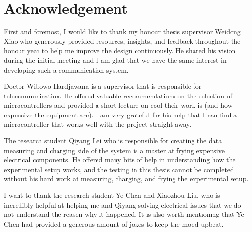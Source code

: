 \documentclass[../thesis.tex]{subfiles}
\begin{document}
\chapter*{Acknowledgement}

First and foremost, I would like to thank my honour thesis supervisor Weidong Xiao who generously provided resources, insights, and feedback throughout the honour year to help me improve the design continuously. He shared his vision during the initial meeting and I am glad that we have the same interest in developing such a communication system.

Doctor Wibowo Hardjawana is a supervisor that is responsible for telecommunication. He offered valuable recommendations on the selection of microcontrollers and provided a short lecture on cool their work is (and how expensive the equipment are). I am very grateful for his help that I can find a microcontroller that works well with the project straight away.

The research student Qiyang Lei who is responsible for creating the data measuring and charging side of the system is a master at frying expensive electrical components. He offered many bits of help in understanding how the experimental setup works, and the testing in this thesis cannot be completed without his hard work at measuring, charging, and frying the experimental setup.

I want to thank the research student Ye Chen and Xiaozhou Liu, who is incredibly helpful at helping me and Qiyang solving electrical issues that we do not understand the reason why it happened. It is also worth mentioning that Ye Chen had provided a generous amount of jokes to keep the mood upbeat.
\end{document}
